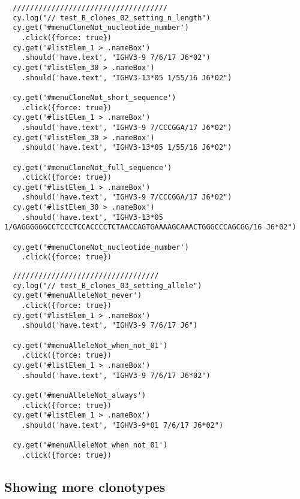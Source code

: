 \begin{verbatim}
  ////////////////////////////////////
  cy.log("// test_B_clones_02_setting_n_length")
  cy.get('#menuCloneNot_nucleotide_number')
    .click({force: true})
  cy.get('#listElem_1 > .nameBox')
    .should('have.text', "IGHV3-9 7/6/17 J6*02")
  cy.get('#listElem_30 > .nameBox')
    .should('have.text', "IGHV3-13*05 1/55/16 J6*02")

  cy.get('#menuCloneNot_short_sequence')
    .click({force: true})
  cy.get('#listElem_1 > .nameBox')
    .should('have.text', "IGHV3-9 7/CCCGGA/17 J6*02")
  cy.get('#listElem_30 > .nameBox')
    .should('have.text', "IGHV3-13*05 1/55/16 J6*02")

  cy.get('#menuCloneNot_full_sequence')
    .click({force: true})
  cy.get('#listElem_1 > .nameBox')
    .should('have.text', "IGHV3-9 7/CCCGGA/17 J6*02")
  cy.get('#listElem_30 > .nameBox')
    .should('have.text', "IGHV3-13*05 1/GAGGGGGGCCTCCCTCCACCCCTCTAACCAGTGAAAAGCAAACTGGGCCCAGCGG/16 J6*02")

  cy.get('#menuCloneNot_nucleotide_number')
    .click({force: true})

\end{verbatim}



\begin{verbatim}
  //////////////////////////////////
  cy.log("// test_B_clones_03_setting_allele")
  cy.get('#menuAlleleNot_never')
    .click({force: true})
  cy.get('#listElem_1 > .nameBox')
    .should('have.text', "IGHV3-9 7/6/17 J6")

  cy.get('#menuAlleleNot_when_not_01')
    .click({force: true})
  cy.get('#listElem_1 > .nameBox')
    .should('have.text', "IGHV3-9 7/6/17 J6*02")

  cy.get('#menuAlleleNot_always')
    .click({force: true})
  cy.get('#listElem_1 > .nameBox')
    .should('have.text', "IGHV3-9*01 7/6/17 J6*02")

  cy.get('#menuAlleleNot_when_not_01')
    .click({force: true})

\end{verbatim}

\subsection{Showing more clonotypes}

